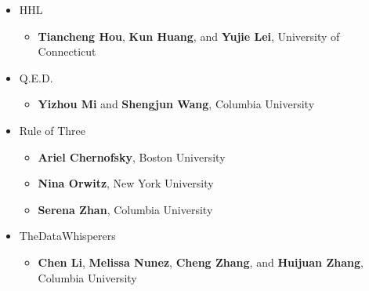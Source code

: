 
\begin{itemize}
\item HHL 
  \begin{itemize}
  \item \textbf{Tiancheng Hou},
    \textbf{Kun Huang}, and
    \textbf{Yujie Lei}, University of Connecticut
  \end{itemize}
\item Q.E.D.
  \begin{itemize}
  \item \textbf{Yizhou Mi} and
    \textbf{Shengjun Wang}, Columbia University
  \end{itemize}
\item Rule of Three
  \begin{itemize}
  \item \textbf{Ariel Chernofsky}, Boston University
  \item \textbf{Nina Orwitz}, New York University
  \item \textbf{Serena Zhan}, Columbia University 
  \end{itemize}
\item TheDataWhisperers
  \begin{itemize}
  \item \textbf{Chen Li},
    \textbf{Melissa Nunez},
    \textbf{Cheng Zhang}, and
    \textbf{Huijuan Zhang}, Columbia University
  \end{itemize}
\end{itemize}




